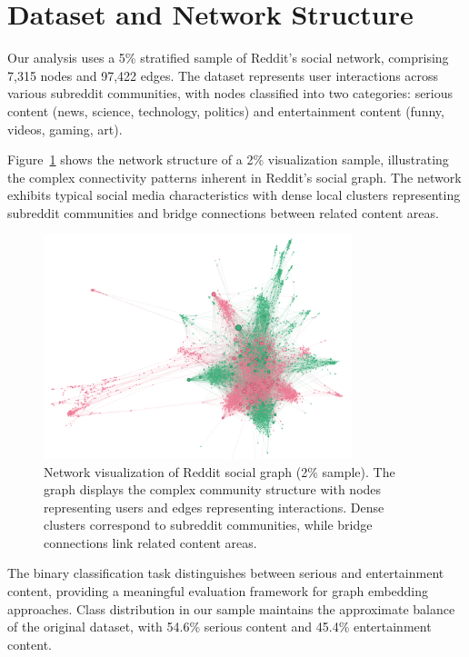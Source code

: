 \documentclass[linenumbers]{aastex701}
\begin{document}
\section{Dataset and Network Structure} \label{sec:dataset}

Our analysis uses a 5\% stratified sample of Reddit's social network, comprising 7,315 nodes and 97,422 edges. The dataset represents user interactions across various subreddit communities, with nodes classified into two categories: serious content (news, science, technology, politics) and entertainment content (funny, videos, gaming, art).

Figure~\ref{fig:reddit_network} shows the network structure of a 2\% visualization sample, illustrating the complex connectivity patterns inherent in Reddit's social graph. The network exhibits typical social media characteristics with dense local clusters representing subreddit communities and bridge connections between related content areas.

\begin{figure}[htbp]
\centering
\includegraphics[width=0.8\textwidth]{reddit_2_percent_graph.png}
\caption{Network visualization of Reddit social graph (2\% sample). The graph displays the complex community structure with nodes representing users and edges representing interactions. Dense clusters correspond to subreddit communities, while bridge connections link related content areas.}
\label{fig:reddit_network}
\end{figure}

The binary classification task distinguishes between serious and entertainment content, providing a meaningful evaluation framework for graph embedding approaches. Class distribution in our sample maintains the approximate balance of the original dataset, with 54.6\% serious content and 45.4\% entertainment content.
\end{document}
